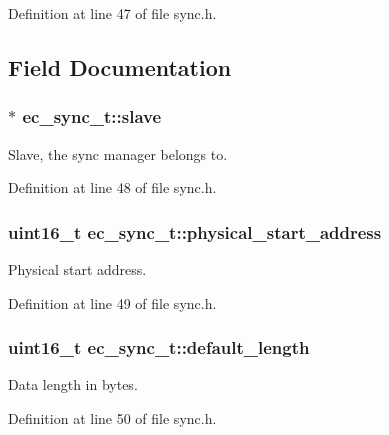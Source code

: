 \-Definition at line 47 of file sync.\-h.



\subsection{\-Field \-Documentation}
\subsubsection[{slave}]{$\ast$ {\bf ec\-\_\-sync\-\_\-t\-::slave}}\label{structec__sync__t_a76825f16d6c2d649740045b5a0c96a26}


\-Slave, the sync manager belongs to. 



\-Definition at line 48 of file sync.\-h.

\subsubsection[{physical\-\_\-start\-\_\-address}]{\setlength{\rightskip}{0pt plus 5cm}uint16\-\_\-t {\bf ec\-\_\-sync\-\_\-t\-::physical\-\_\-start\-\_\-address}}\label{structec__sync__t_a35017ae8615f6eee4ecb5ed044501184}


\-Physical start address. 



\-Definition at line 49 of file sync.\-h.

\subsubsection[{default\-\_\-length}]{\setlength{\rightskip}{0pt plus 5cm}uint16\-\_\-t {\bf ec\-\_\-sync\-\_\-t\-::default\-\_\-length}}\label{structec__sync__t_ade13d88d878f5e87763c34b636a4c1a1}


\-Data length in bytes. 



\-Definition at line 50 of file sync.\-h.

